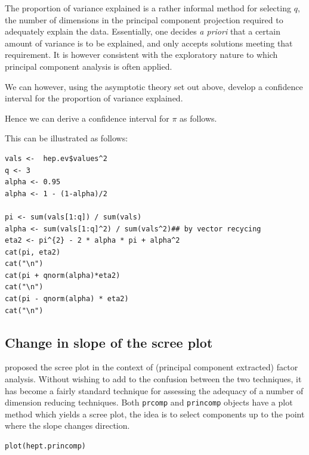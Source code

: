 The proportion of variance explained is a rather informal method for selecting $q$, the number of dimensions in the principal component projection required to adequately explain the data.   Essentially, one decides \textit{a priori} that a certain amount of variance is to be explained, and only accepts solutions meeting that requirement.   It is however consistent with the exploratory nature to which principal component analysis is often applied.


We can however, using the asymptotic theory set out above, develop a confidence interval for the proportion of variance explained.   %


Hence we can derive a confidence interval for $\pi$ as follows.

This can be illustrated as follows:

\singlespacing
\begin{verbatim}
vals <-  hep.ev$values^2
q <- 3
alpha <- 0.95
alpha <- 1 - (1-alpha)/2

pi <- sum(vals[1:q]) / sum(vals)
alpha <- sum(vals[1:q]^2) / sum(vals^2)## by vector recycing
eta2 <- pi^{2} - 2 * alpha * pi + alpha^2
cat(pi, eta2)
cat("\n")
cat(pi + qnorm(alpha)*eta2)
cat("\n")
cat(pi - qnorm(alpha) * eta2)
cat("\n")
\end{verbatim}
\onehalfspacing





\subsection{Change in slope of the scree plot}
\label{screeslope}

\cite{Cattell:1966} proposed the scree plot in the context of (principal component extracted) factor analysis.   Without wishing to add to the confusion between the two techniques, it has become a fairly standard technique for assessing the adequacy of a number of dimension reducing techniques.   Both \texttt{prcomp} and \texttt{princomp} objects have a plot method which yields a scree plot, the idea is to select components up to the point where the slope changes direction.

\singlespacing
\begin{verbatim}
plot(hept.princomp)
\end{verbatim}
\onehalfspacing

